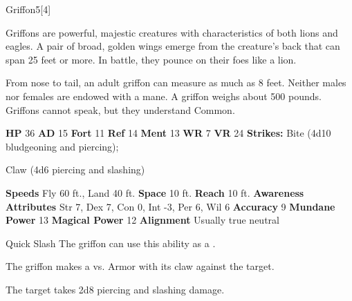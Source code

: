   \begin{monsection}{Griffon}{5}[4]
    \vspace{-1em}\vspace{-1em}
    \vspace{0em}

    
        Griffons are powerful, majestic creatures with characteristics of both lions and eagles.
        A pair of broad, golden wings emerge from the creature’s back that can span 25 feet or more.
        In battle, they pounce on their foes like a lion.
      
        From nose to tail, an adult griffon can measure as much as 8 feet.
        Neither males nor females are endowed with a mane.
        A griffon weighs about 500 pounds.
        Griffons cannot speak, but they understand Common.
      

    \begin{spellcontent}
      \begin{spelltargetinginfo}
        \pari \textbf{HP} 36 \monsep
          \textbf{AD} 15 \monsep
          \textbf{Fort} 11 \monsep
          \textbf{Ref} 14 \monsep
          \textbf{Ment} 13
        \pari \textbf{WR} 7 \monsep
        \textbf{VR} 24
        \pari \textbf{Strikes:}
            Bite  (4d10 bludgeoning and piercing);
\par Claw  (4d6 piercing and slashing)
      \end{spelltargetinginfo}
    \end{spellcontent}
    \begin{monsterfooter}
      \pari \textbf{Speeds} Fly 60 ft., Land 40 ft. \monsep
        \textbf{Space} 10 ft. \monsep
        \textbf{Reach} 10 ft.
      \pari \textbf{Awareness} 
      \pari \textbf{Attributes}
        Str 7, Dex 7,
        Con 0, Int -3,
        Per 6, Wil 6
      \pari \textbf{Accuracy} 9 \monsep
        \textbf{Mundane Power} 13 \monsep
      \textbf{Magical Power} 12
      \pari \textbf{Alignment} Usually true neutral
    \end{monsterfooter}
  \end{monsection}
  \begin{freeability}{Quick Slash}
      The griffon can use this ability as a .\par The griffon makes a 
         vs. Armor
        with its claw against the target.
    
    \hit The target takes 2d8 piercing and slashing damage.
    \end{freeability}
  
